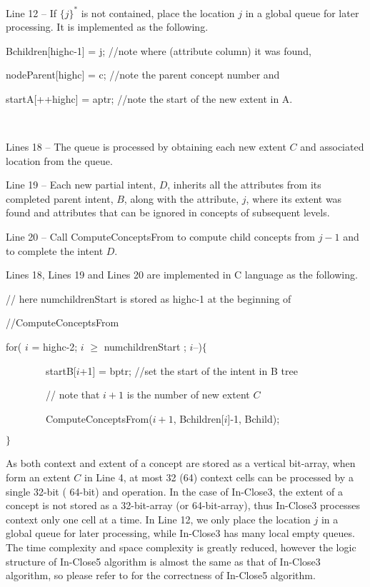 \documentclass[11pt]{article}
\numberwithin{equation}{subsection}
\begin{document}
Line 12 -- If $\{j\}^*$ is not contained, place the   location   $j$  in a global queue for later processing.
It is implemented as the following.

			Bchildren[highc-1] = j;			//note where (attribute column) it was found,
					
					nodeParent[highc] = c;				//note the parent concept number and

					startA[++highc] = aptr;				//note the start of the new extent in A.
			
\


Lines 18 -- The queue is processed by obtaining each new extent $C$ and associated location from the queue.

Line 19 -- Each new partial intent, $D$, inherits all the attributes from its completed parent intent, $B$, along with the attribute, $j$, where its extent was found and attributes that can be ignored in  concepts of subsequent levels.

Line 20 -- Call ComputeConceptsFrom to compute child concepts from $j-1$ and to complete the intent $D$.

Lines 18, Lines 19 and Lines 20 are implemented in C language as the following.

// here numchildrenStart is stored as highc-1 at the beginning of

//ComputeConceptsFrom

for( $i$ = highc-2; $i$ $\geq$ numchildrenStart ; $i$--)$\{$

\ \ \ \	 \ \ \ \			startB[$i$+1] = bptr;						//set the start of the intent in B tree

\ \ \ \	 \ \ \ \    // note that $i+1$ is the number of new extent $C$

\ \ \ \	 \ \ \ \			ComputeConceptsFrom($i+1$, Bchildren[$i$]-1, Bchild);	

$\}$


As both context and extent of a concept are stored as a vertical bit-array,
when form an extent $C$ in Line 4, at most 32 (64)
context cells can be processed by a single 32-bit ( 64-bit)  and operation.
In the case of In-Close3, the extent of a concept is not stored as a 32-bit-array (or 64-bit-array), thus In-Close3 processes context only one cell at a time. %
In Line 12, we only place the location $j$ in a global queue for later
processing,  while In-Close3 has many local empty queues.
The  time complexity and space complexity is greatly reduced, however
the logic structure of In-Close5  algorithm is almost the same as that of In-Close3  algorithm, so please refer to \cite{Andrews} for the correctness of
 In-Close5  algorithm. %
\end{document}
